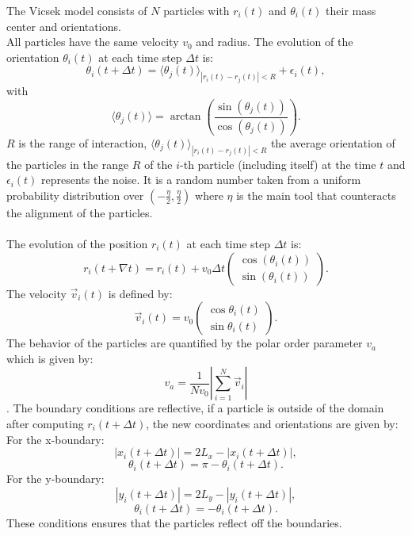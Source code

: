 \documentclass{article}
\begin{document}
The Vicsek model consists of $N$ particles with $r_i(t)$ and $\theta_i(t)$ 
their mass center and orientations.\\
All particles have the same velocity $v_0$ and radius.
The evolution of the orientation $\theta_i(t)$ at each time step $\Delta t$ is:
$$\theta_i(t + \Delta t) = \langle\theta_j(t)\rangle_{|r_i(t) - r_j(t)| < R} + \epsilon_i(t),$$
with
$$\langle\theta_j(t)\rangle = \arctan\left(\frac{\sin(\theta_j(t))}{\cos(\theta_j(t))}\right).$$
$R$ is the range of interaction, $\langle\theta_j(t)\rangle_{|r_i(t) - r_j(t)| < R}$ the average 
orientation of the particles in the range $R$ of
 the $i$-th particle (including itself) at the time $t$ and $\epsilon_i(t)$ represents the noise. 
 It is a random number taken from a uniform probability distribution
over $\left(-\frac{\eta}{2}, \frac{\eta}{2}\right)$ where $\eta$ is the main tool that counteracts the alignment of the particles.\\
\\
The evolution of the position $r_i(t)$ at each time step $\Delta t$ is:
$$ r_i(t + \nabla t) = r_i(t) + v_0\Delta t \begin{pmatrix}
    \cos(\theta_i(t))\\
    \sin(\theta_i(t))
\end{pmatrix}.$$
The velocity $\vec{v}_i(t)$ is defined by:
$$\vec{v}_i(t) = v_0\begin{pmatrix}
    \cos\theta_i(t)\\
    \sin\theta_i(t)
\end{pmatrix}.$$
The behavior of the particles are quantified by the polar order parameter $v_a$ which is given by:
$$v_a = \frac{1}{Nv_0}\left|\sum^{N}_{i=1}\vec{v}_i\right|$$.
The boundary conditions are reflective, if a particle is outside of the domain after computing $r_i(t + \Delta t)$, the new coordinates and orientations are given by:\\
For the x-boundary:
$$|x_i(t + \Delta t)| = 2L_x - |x_i(t + \Delta t)|,$$
$$\theta_{i}(t + \Delta t) = \pi - \theta_i(t + \Delta t).$$
For the y-boundary:
$$|y_i(t + \Delta t)| = 2L_y - |y_i(t + \Delta t)|,$$
$$\theta_i(t + \Delta t) = -\theta_i(t + \Delta t).$$
These conditions ensures that the particles reflect off the boundaries.

\newpage
\end{document}
